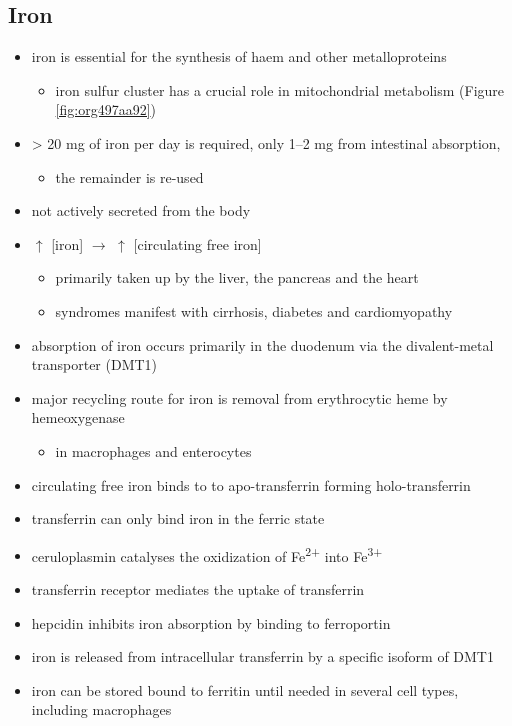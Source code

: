 \documentclass[12pt]{scrartcl}
\begin{document}
\subsection{Iron}
\label{sec:org0ce5f7c}
\begin{itemize}
\item iron is essential for the synthesis of haem and other
metalloproteins
\begin{itemize}
\item iron sulfur cluster has a crucial role in mitochondrial metabolism (Figure \ref{fig:org497aa92})
\end{itemize}
\item \textgreater{} 20 mg of iron per day is required, only 1–2 mg from intestinal absorption,
\begin{itemize}
\item the remainder is re-used
\end{itemize}
\item not actively secreted from the body
\item \(\uparrow\) [iron] \(\to\) \(\uparrow\) [circulating free iron]
\begin{itemize}
\item primarily taken up by the liver, the pancreas and the heart
\item syndromes manifest with cirrhosis, diabetes and cardiomyopathy
\end{itemize}
\item absorption of iron occurs primarily in the duodenum via the
divalent-metal transporter (DMT1)
\item major recycling route for iron is removal from erythrocytic heme by
hemeoxygenase
\begin{itemize}
\item in macrophages and enterocytes
\end{itemize}
\item circulating free iron binds to to apo-transferrin forming holo-transferrin
\item transferrin can only bind iron in the ferric state
\item ceruloplasmin catalyses the oxidization of Fe\textsuperscript{2+} into Fe\textsuperscript{3+}
\item transferrin receptor mediates the uptake of transferrin
\item hepcidin inhibits iron absorption by binding to ferroportin
\item iron is released from intracellular transferrin by a specific isoform of DMT1
\item iron can be stored bound to ferritin until needed in several cell
types, including macrophages
\end{itemize}
\end{document}
